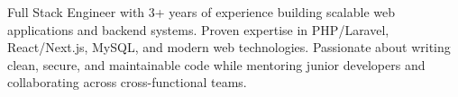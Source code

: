 \documentclass[letter,10pt]{article}
\begin{document}
Full Stack Engineer with 3+ years of experience building scalable web applications and backend systems. Proven expertise in PHP/Laravel, React/Next.js, MySQL, and modern web technologies. Passionate about writing clean, secure, and maintainable code while mentoring junior developers and collaborating across cross-functional teams.
\end{document}
